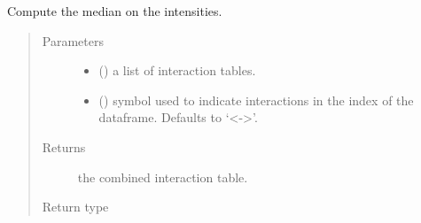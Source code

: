 \documentclass[letterpaper,10pt,english]{sphinxmanual}
\begin{document}
\begin{fulllineitems}
\label{\detokenize{_modules/cosifer.combiners:cosifer.combiners.cit.median_table}}
Compute the median on the intensities.
\begin{quote}\begin{description}
\item[{Parameters}] \leavevmode\begin{itemize}
\item {} 
 () \textendash{} a list of interaction tables.

\item {} 
 (\sphinxstyleliteralemphasis{\sphinxupquote{, }}) \textendash{} symbol used to indicate
interactions in the index of the dataframe. Defaults to ‘\textless{}-\textgreater{}’.

\end{itemize}

\item[{Returns}] \leavevmode
the combined interaction table.

\item[{Return type}] \leavevmode
{\hyperref[\detokenize{_modules/cosifer.collections:cosifer.collections.interaction_table.InteractionTable}]{}}

\end{description}\end{quote}

\end{fulllineitems}

\end{document}
